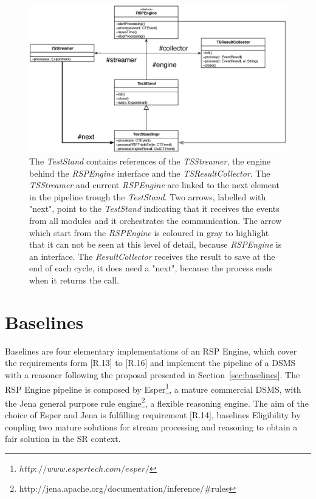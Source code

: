 \begin{figure}[p!]
  \centering
	\includegraphics[width=0.9\linewidth]{images/uml_teststand_modules}
	\caption[\name \textsc{TestStand} and Modules  - UML Schema] {The \textit{TestStand} contains references of the \textit{TSStreamer}, the engine behind the \textit{RSPEngine} interface and the \textit{TSResultCollector}. The \textit{TSStreamer} and current \textit{RSPEngine} are linked to the next element in the pipeline trough the \textit{TestStand}. Two arrows, labelled with "next", point to the  \textit{TestStand} indicating that it receives the events from all modules and it orchestrates the communication. The arrow which start from the \textit{RSPEngine} is coloured in gray to highlight that it can not be seen at this level of detail, because \textit{RSPEngine} is an interface. The \textit{ResultCollector} receives the result to save at the end of each cycle, it does need a "next", because the process ends when it returns the call.} 
  	\label{fig:uml_teststand_modules}
\end{figure}

\pagebreak

\section{Baselines}\label{sec:baselines-impl}

\name Baselines are four elementary implementations of an RSP Engine, which  cover the requirements form [R.13] to [R.16] and implement the pipeline of a DSMS with a reasoner following the proposal presented in Section~\ref{sec:baselines}. 
The RSP Engine pipeline is composed by Esper\footnote{$http://www.espertech.com/esper/$}, a mature commercial DSMS, with the Jena general purpose rule engine\footnote{http://jena.apache.org/documentation/inference/\#rules}, a flexible reasoning engine.  The aim of the choice of Esper and Jena is fulfilling requirement [R.14], baselines Eligibility by coupling two mature solutions for stream processing and reasoning to obtain a fair solution in the SR context.

